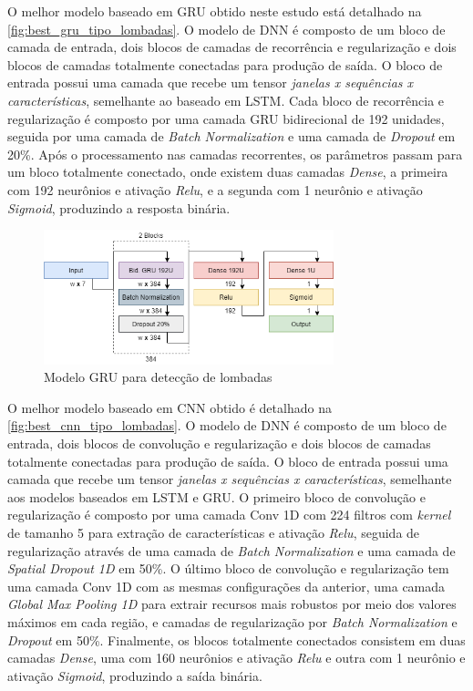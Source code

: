 O melhor modelo baseado em GRU obtido neste estudo está detalhado na \autoref{fig:best_gru_tipo_lombadas}. O modelo de DNN é composto de um bloco de camada de entrada, dois blocos de camadas de recorrência e regularização e dois blocos de camadas totalmente conectadas para produção de saída. O bloco de entrada possui uma camada que recebe um tensor \emph{janelas x sequências x características}, semelhante ao baseado em LSTM. Cada bloco de recorrência e regularização é composto por uma camada GRU bidirecional de 192 unidades, seguida por uma camada de \textit{Batch Normalization} e uma camada de \textit{Dropout} em 20\%. Após o processamento nas camadas recorrentes, os parâmetros passam para um bloco totalmente conectado, onde existem duas camadas \textit{Dense}, a primeira com 192 neurônios e ativação \textit{Relu}, e a segunda com 1 neurônio e ativação \textit{Sigmoid}, produzindo a resposta binária.

\begin{figure}[h!]
  \centering
  \caption{Modelo GRU para detecção de lombadas}
  \label{fig:best_gru_tipo_lombadas}
  \includegraphics[width=0.75\textwidth]{figuras/fig_41.png}
\end{figure}

O melhor modelo baseado em CNN obtido é detalhado na \autoref{fig:best_cnn_tipo_lombadas}. O modelo de DNN é composto de um bloco de entrada, dois blocos de convolução e regularização e dois blocos de camadas totalmente conectadas para produção de saída. O bloco de entrada possui uma camada que recebe um tensor \emph{janelas x sequências x características}, semelhante aos modelos baseados em LSTM e GRU. O primeiro bloco de convolução e regularização é composto por uma camada Conv 1D com 224 filtros com \textit{kernel} de tamanho 5 para extração de características e ativação \textit{Relu}, seguida de regularização através de uma camada de \textit{Batch Normalization} e uma camada de \textit{Spatial Dropout 1D} em 50\%. O último bloco de convolução e regularização tem uma camada Conv 1D com as mesmas configurações da anterior, uma camada \textit{Global Max Pooling 1D} para extrair recursos mais robustos por meio dos valores máximos em cada região, e camadas de regularização por \textit{Batch Normalization} e \textit{Dropout} em 50\%. Finalmente, os blocos totalmente conectados consistem em duas camadas \textit{Dense}, uma com 160 neurônios e ativação \textit{Relu} e outra com 1 neurônio e ativação \textit{Sigmoid}, produzindo a saída binária.

